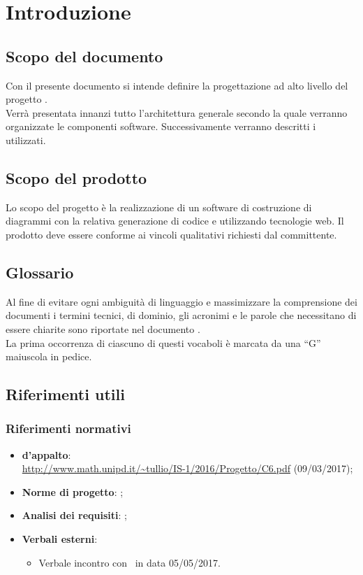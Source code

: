 \documentclass[../PianoDiQualifica.tex]{subfiles}
\begin{document}
	\section{Introduzione}
		\subsection{Scopo del documento} 
			Con il presente documento si intende definire la progettazione ad alto livello
			del progetto \progetto.\\
			Verrà presentata innanzi tutto l'architettura generale secondo la quale verranno
			organizzate le componenti software. Successivamente verranno descritti
			i  utilizzati.
		\subsection{Scopo del prodotto}
			Lo scopo del progetto è la realizzazione di un software di
			costruzione di diagrammi  con la relativa generazione
			di codice  e  utilizzando tecnologie
			web. Il prodotto deve essere conforme ai vincoli qualitativi
			richiesti dal committente.
		\subsection{Glossario}
			Al fine di evitare ogni ambiguità di linguaggio e massimizzare la
			comprensione dei documenti i termini tecnici, di dominio, gli
			acronimi e le parole che necessitano di essere chiarite sono
			riportate nel documento \glossariov.\\
			La prima occorrenza di ciascuno di questi vocaboli è
			marcata da una ``G'' maiuscola in pedice.
		\subsection{Riferimenti utili}
			\subsubsection{Riferimenti normativi}
    			\begin{itemize}
    				\item \textbf{ d'appalto}:\\
    				\url{http://www.math.unipd.it/~tullio/IS-1/2016/Progetto/C6.pdf} (09/03/2017);
    				\item \textbf{Norme di progetto}: \normediprogettov;
    				\item \textbf{Analisi dei requisiti}: \analisideirequisitiv;
    				\item \textbf{Verbali esterni}:
    				\begin{itemize}
    					\item Verbale incontro con \proponente\ in data 05/05/2017.
    				\end{itemize}
				\end{itemize}
\end{document}
